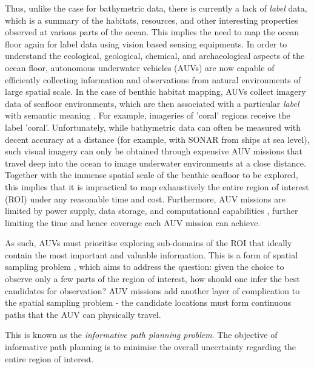 		Thus, unlike the case for bathymetric data, there is currently a lack of \textit{label} data, which is a summary of the habitats, resources, and other interesting properties observed at various parts of the ocean. This implies the need to map the ocean floor again for label data using vision based sensing equipments. In order to understand the ecological, geological, chemical, and archaeological aspects of the ocean floor, autonomous underwater vehicles (AUVs) are now capable of efficiently collecting information and observations from natural environments of large spatial scale. In the case of benthic habitat mapping, AUVs collect imagery data of seafloor environments, which are then associated with a particular \textit{label} with semantic meaning \citep{Steinberg2015128}. For example, imageries of 'coral' regions receive the label 'coral'. Unfortunately, while bathymetric data can often be measured with decent accuracy at a distance (for example, with SONAR from ships at sea level), such visual imagery can only be obtained through expensive AUV missions that travel deep into the ocean to image underwater environments at a close distance. Together with the immense spatial scale of the benthic seafloor to be explored, this implies that it is impractical to map exhaustively the entire region of interest (ROI) under any reasonable time and cost. Furthermore, AUV missions are limited by power supply, data storage, and computational capabilities \citep{AsherBender}, further limiting the time and hence coverage each AUV mission can achieve. 
		
		As such, AUVs must prioritise exploring sub-domains of the ROI that ideally contain the most important and valuable information. This is a form of spatial sampling problem \citep{Rigby:ROB20372}, which aims to address the question: given the choice to observe only a few parts of the region of interest, how should one infer the best candidates for observation? AUV missions add another layer of complication to the spatial sampling problem - the candidate locations must form continuous paths that the AUV can physically travel.
		
		 This is known as the \textit{informative path planning problem}. The objective of informative path planning is to minimise the overall uncertainty regarding the entire region of interest.
		

